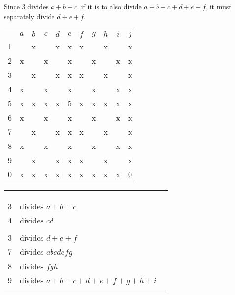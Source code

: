 Since 3 divides $a+b+c$, if it is to also divide $a+b+c+d+e+f$, it must separately divide $d+e+f$.
\begin{center}
\begin{tabular}{ccccccccccc}
			&	$a$	&	$b$	&	$c$	&	$d$	&	$e$	&	$f$	&	$g$	&	$h$	&	$i$	&	$j$	\\
	1		&		&	x	&		&	x	&	x	&	x	&		&	x	&		&	x	\\
	2		&	x	&		&	x	&		&	x	&		&	x	&		&	x	&	x	\\
	3		&		&	x	&		&	x	&	x	&	x	&		&	x	&		&	x	\\
	4		&	x	&		&	x	&		&	x	&		&	x	&		&	x	&	x	\\
	5		&	x	&	x	&	x	&	x	&	5	&	x	&	x	&	x	&	x	&	x	\\
	6		&	x	&		&	x	&		&	x	&		&	x	&		&	x	&	x	\\
	7		&		&	x	&		&	x	&	x	&	x	&		&	x	&		&	x	\\
	8		&	x	&		&	x	&		&	x	&		&	x	&		&	x	&	x	\\
	9		&		&	x	&		&	x	&	x	&	x	&		&	x	&		&	x	\\
	0		&	x	&	x	&	x	&	x	&	x	&	x	&	x	&	x	&	x	&	0	\\
\end{tabular}
\hspace{1cm}\vline\hspace{1cm}
\begin{tabular}{rll}
	& 		\\
	& 		\\
	& 		\\
	3	&	divides $a+b+c$					\\
	4	&	divides $cd$					\\
		&	\\
	3	&	divides $d+e+f$					\\
	7	&	divides $abcdefg$				\\
	8	&	divides $fgh$					\\
	9	&	divides $a+b+c+d+e+f+g+h+i$		\\
		&	
\end{tabular}
\end{center}

